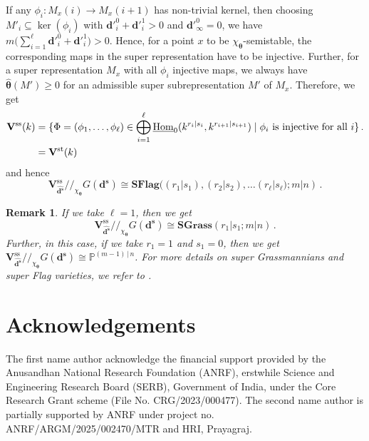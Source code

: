 \documentclass[12pt, reqno]{amsart}
\theoremstyle{plain}
\newtheorem{remark}[theorem]{Remark}
\numberwithin{equation}{section}
\def \d{\mathbf{d}}
\def \sd{\mathbf{d^s}}
\def \ra{\rightarrow}
\def \btheta{\boldsymbol{\theta}}
\newcommand{\Hom}{\operatorname{Hom}\nolimits}
\begin{document}
If any $\phi_i \colon M_x(i)\ra M_x(i+1)$ has non-trivial kernel, then choosing $M'_i \subseteq \ker(\phi_i)$ with $\d'^{0}_{i} + \d'^{1}_{i} > 0$ and $\d'^{0}_{\infty} = 0$, we have $m\Big(\sum_{i=1}^\ell \d'^{0}_{i} + \d'^{1}_{i}\Big) > 0$. Hence, for a point $x$ to be $\chi_{\btheta}$-semistable, the corresponding maps in the super representation have to be injective.
Further, for a super representation $M_x$ with all $\phi_i$ injective maps, we always have $\hat{\btheta}(M') \ge 0$ for an admissible super subrepresentation $M'$ of $M_x$.
Therefore, we get
\[ 
\begin{aligned}
\mathbf{V}^{\rm ss}(k) & = \{ \Phi = (\phi_1, \dots, \phi_\ell)\in \bigoplus_{i=1}^\ell \underline{\Hom}_0(k^{r_i|s_i}, k^{r_{i+1}|s_{i+1}})\mid \phi_i \text{ is injective for all } i \}\,.\\
& = \mathbf{V}^{\rm st}(k)
\end{aligned}
\]
and hence
$$
\mathbf{V}_{\hat{\sd}}^{\mathrm{ss}}/ \!\! /_{\! \!\chi_{\btheta}} G(\sd) \cong \mathbf{SFlag}((r_1|s_1), (r_2|s_2), \dots (r_\ell|s_\ell); m|n)\,.
$$

\begin{remark}{\rm
If we take $\ell=1$, then we get 
$$
\mathbf{V}_{\hat{\sd}}^{\mathrm{ss}}/ \!\! /_{\! \!\chi_{\btheta}} G(\sd) \cong \mathbf{SGrass}(r_1|s_1; m|n)\,.
$$
Further, in this case, if we take $r_1 = 1$ and $s_1 = 0$, then we get 
$\mathbf{V}_{\hat{\sd}}^{\mathrm{ss}}/ \!\! /_{\! \!\chi_{\btheta}} G(\sd) \cong \mathbb{P}^{(m-1)\,|\, n}$.
For more details on super Grassmannians and super Flag varieties, we refer to \cite{BR21}.
} 
\end{remark}

\section*{Acknowledgements}
The first name author acknowledge the financial support provided by the Anusandhan National Research Foundation (ANRF), erstwhile Science and Engineering Research Board (SERB), Government of India, under the Core Research Grant scheme (File No. CRG/2023/000477). The second name author is partially supported by ANRF under project no. ANRF/ARGM/2025/002470/MTR and HRI, Prayagraj.
\end{document}
